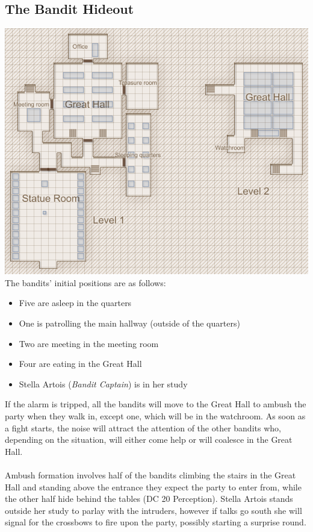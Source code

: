 \subsection{The Bandit Hideout}
\includegraphics[scale=0.5]{combats/banditcave.PNG}
The bandits' initial positions are as follows:
\begin{itemize}
\item Five are asleep in the quarters
\item One is patrolling the main hallway (outside of the quarters)
\item Two are meeting in the meeting room
\item Four are eating in the Great Hall
\item Stella Artois (\textit{Bandit Captain}) is in her study
\end{itemize}
If the alarm is tripped, all the bandits will move to the Great Hall to ambush the party when they walk in, except one, which will be in the watchroom. As soon as a fight starts, the noise will attract the attention of the other bandits who, depending on the situation, will either come help or will coalesce in the Great Hall.\\
\\
Ambush formation involves half of the bandits climbing the stairs in the Great Hall and standing above the entrance they expect the party to enter from, while the other half hide behind the tables (DC 20 Perception). Stella Artois stands outside her study to parlay with the intruders, however if talks go south she will signal for the crossbows to fire upon the party, possibly starting a surprise round. \\
